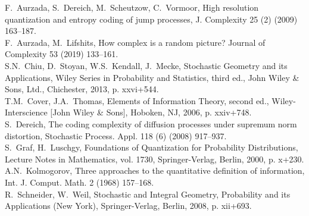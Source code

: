 \documentclass[12pt]{article}
\theoremstyle{plain}
\newtheorem{thm}{Теорема} %
\theoremstyle{definition}
\theoremstyle{remark}
\def\geq{\geqslant}
\def\leq{\leqslant}
\newcommand{\PP}{\mathbb{P}}
\begin{document}




\begin{thebibliography}{99}
{\baselineskip=12pt
F.~Aurzada, S.~Dereich, M.~Scheutzow, C.~Vormoor, High resolution quantization and entropy coding of jump processes, J.
Complexity 25 (2) (2009) 163–187.\\

F.~Aurzada, M.~Lifshits, How complex is a random picture? Journal of Complexity 53 (2019) 133–161.\\

 S.N.~Chiu, D.~Stoyan, W.S.~Kendall, J.~Mecke, Stochastic Geometry and its Applications, Wiley Series in Probability and
Statistics, third ed., John Wiley \& Sons, Ltd., Chichester, 2013, p. xxvi+544.\\

T.M.~Cover, J.A.~Thomas, Elements of Information Theory, second ed., Wiley-Interscience [John Wiley \& Sons], Hoboken,
NJ, 2006, p. xxiv+748.\\

S.~Dereich, The coding complexity of diffusion processes under supremum norm distortion, Stochastic Process. Appl. 118
(6) (2008) 917–937.\\

S.~Graf, H.~Luschgy, Foundations of Quantization for Probability Distributions, Lecture Notes in Mathematics, vol. 1730,
Springer-Verlag, Berlin, 2000, p. x+230.\\


A.N.~Kolmogorov, Three approaches to the quantitative definition of information, Int. J. Comput. Math. 2 (1968) 157–168.\\




R.~Schneider, W.~Weil, Stochastic and Integral Geometry, Probability and its Applications (New York), Springer-Verlag,
Berlin, 2008, p. xii+693.
}
\end{thebibliography}
\end{document}
